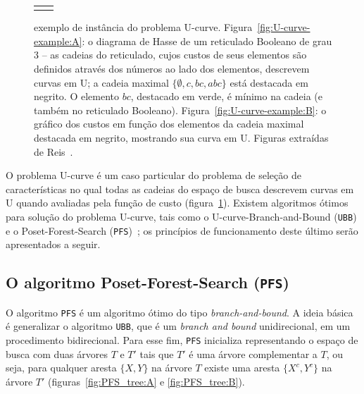 \documentclass[12pt]{article}
\begin{document}
\begin{figure}[h]
\begin{tabular}{c c}
{        \label{fig:U-curve-example:B} 
    }
\end{tabular}
\caption{exemplo de instância do problema U-curve. 
Figura~\ref{fig:U-curve-example:A}: o diagrama de Hasse de um reticulado
Booleano de grau $3$ -- as cadeias do reticulado, cujos custos de seus
elementos são definidos através dos números ao lado dos elementos, descrevem
curvas em U; a cadeia maximal $\{ \emptyset, c, bc, abc \}$ está
destacada em negrito. O elemento $bc$, destacado em verde, é mínimo na
cadeia (e também no reticulado Booleano). 
Figura~\ref{fig:U-curve-example:B}: o gráfico dos custos em função dos
elementos da cadeia maximal destacada em negrito, mostrando sua curva em
U. Figuras extraídas de Reis~\cite{msreis thesis}.} 
    \label{fig:U-curve} 
\end{figure}



O problema U-curve é um caso particular do problema de seleção de
características no qual todas as cadeias do espaço de busca descrevem
curvas em U quando avaliadas pela função de custo (figura~\ref{fig:U-curve}).
Existem algoritmos
ótimos para solução do problema U-curve, tais como o U-curve-Branch-and-Bound
({\tt UBB}) e o Poset-Forest-Search ({\tt PFS})~\cite{msreis thesis}; os
princípios de funcionamento deste último serão apresentados a seguir.


\subsection{O algoritmo Poset-Forest-Search ({\tt PFS})}
O algoritmo {\tt PFS} é um algoritmo ótimo do tipo 
{\em branch-and-bound}. A ideia básica é generalizar o algoritmo {\tt UBB},
que é um {\em branch and bound} unidirecional, em um procedimento bidirecional.
Para esse fim, {\tt PFS} inicializa representando o espaço de 
busca com duas árvores $T$ e $T'$ tais que $T'$ é uma árvore complementar a 
$T$, ou seja, para qualquer aresta $\{ X, Y \}$ na
árvore $T$ existe uma aresta $\{ X^c, Y^c \}$ na árvore $T'$ 
(figuras~\ref{fig:PFS_tree:A} e \ref{fig:PFS_tree:B}).
\end{document}
